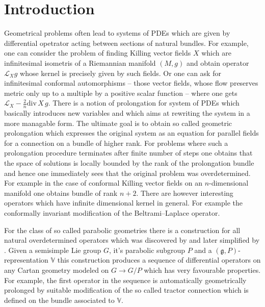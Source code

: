 \documentclass[12pt,a4paper,final]{report}
\begin{document}



\hypersetup{unicode}
\hypersetup{breaklinks=true}



\chapter*{Introduction}

Geometrical problems often lead to systems of PDEs which are given by differential opetrator acting between sections of natural bundles. For example, one can consider the problem of finding Killing vector fields $X$ which are infinitesimal isometris of a Riemannian manifold $(M, g)$ and obtain operator $\mathcal{L}_X g$ whose kernel is precisely given by such fields. Or one can ask for infinitesimal conformal automorphisms -- those vector fields, whose flow preserves metric only up to a multiple by a positive scalar function -- where one gets $\mathcal{L}_X - \frac{2}{n} \mathrm{div}\, X \, g.$ There is a notion of prolongation for system of PDEs which basically introduces new variables and which aims at rewriting the system in a more managable form. The ultimate goal is to obtain so called geometric prolongation which expresses the original system as an equation for parallel fields for a connection on a bundle of higher rank. For problems where such a prolongation procedure terminates after finite number of steps one obtains that the space of solutions is locally bounded by the rank of the prolongation bundle and hence one immediately sees that the original problem was overdetermined. For example in the case of conformal Killing vector fields on an $n$-dimensional manifold one obtains bundle of rank $n+2.$ There are however interesting operators which have infinite dimensional kernel in general. For example the conformally invariant  modification of the Beltrami--Laplace operator.

For the class of so called parabolic geometries there is a construction for all natural overdetermined operators which was discovered by \cite{cap_bernstein-gelfand-gelfand_2001} and later simplified by \cite{calderbank_differential_2001}. Given a semisimple Lie group $G$, it's parabolic subgroup $P$ and a $(\mathfrak{g}, P)$-representation $\mathbb{V}$ this construction produces a sequence of differential operators on any Cartan geometry modeled on $G \to G/P$ which has very favourable properties. For example, the first operator in the sequence is automatically geometrically prolonged by suitable modification of the so called tractor connection which is defined on the bundle associated to $\mathbb{V}.$  
\end{document}
